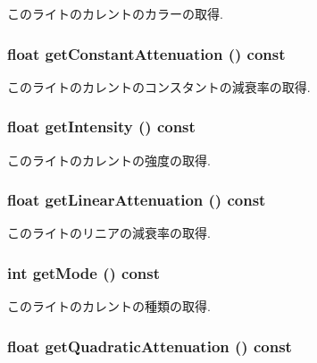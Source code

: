 このライトのカレントのカラーの取得. \hypertarget{classm3g_1_1Light_9553ab96cb7639acafcebb81888af687}{
\subsubsection[{getConstantAttenuation}]{\setlength{\rightskip}{0pt plus 5cm}float getConstantAttenuation () const}}
\label{classm3g_1_1Light_9553ab96cb7639acafcebb81888af687}


このライトのカレントのコンスタントの減衰率の取得. \hypertarget{classm3g_1_1Light_ca846da41d09a6ae01d6b362c33e938d}{
\subsubsection[{getIntensity}]{\setlength{\rightskip}{0pt plus 5cm}float getIntensity () const}}
\label{classm3g_1_1Light_ca846da41d09a6ae01d6b362c33e938d}


このライトのカレントの強度の取得. \hypertarget{classm3g_1_1Light_50e949b0cc2014e576987379cac07769}{
\subsubsection[{getLinearAttenuation}]{\setlength{\rightskip}{0pt plus 5cm}float getLinearAttenuation () const}}
\label{classm3g_1_1Light_50e949b0cc2014e576987379cac07769}


このライトのリニアの減衰率の取得. \hypertarget{classm3g_1_1Light_d4ce4524e4751fe5e3cfb8c270347d54}{
\subsubsection[{getMode}]{\setlength{\rightskip}{0pt plus 5cm}int getMode () const}}
\label{classm3g_1_1Light_d4ce4524e4751fe5e3cfb8c270347d54}


このライトのカレントの種類の取得. \hypertarget{classm3g_1_1Light_9ec7130ca1977cfeb4b2cbebc31971b4}{
\subsubsection[{getQuadraticAttenuation}]{\setlength{\rightskip}{0pt plus 5cm}float getQuadraticAttenuation () const}}
\label{classm3g_1_1Light_9ec7130ca1977cfeb4b2cbebc31971b4}


